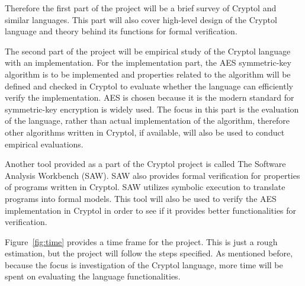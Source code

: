 \documentclass[a4paper, notitlepage]{report}
\begin{document}
Therefore the first part of the project will be a brief survey of Cryptol
and similar languages. This part will also cover high-level design of
the Cryptol language and theory behind its functions for formal verification.

The second part of the project will be empirical study of the Cryptol language
with an implementation.
For the implementation part, the AES symmetric-key algorithm
\cite{standard2001announcing, bertoni2002efficient} is to be implemented
 and properties related to the algorithm will be defined and checked
in Cryptol to evaluate whether the language can efficiently verify
the implementation. AES is chosen because it is the modern standard
for symmetric-key encryption is widely used. 
The focus in this part is the evaluation of the language,
rather than actual implementation of the algorithm, therefore other
algorithms written in Cryptol, if available, will
also be used to conduct empirical evaluations.

Another tool provided as a part of the Cryptol project is called
The Software Analysis Workbench (SAW). SAW also provides formal verification
for properties of programs written in Cryptol.
SAW utilizes symbolic execution to translate programs into formal models.
This tool will also be used to verify the AES implementation in Cryptol
in order to see if it provides better functionalities for verification.

Figure~\ref{fig:time} provides a time frame for the project. This is just
a rough estimation, but the project will follow the steps specified.
As mentioned before, because the focus is investigation
of the Cryptol language, more time will be spent on evaluating the language
functionalities. 




\newpage



\end{document}
